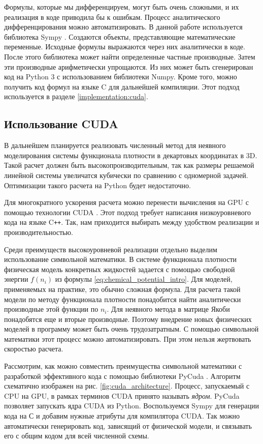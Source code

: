 Формулы, которые мы дифференцируем, могут быть очень сложными, и их реализация в коде приводила бы к ошибкам. Процесс аналитического дифференцирования можно автоматизировать. В данной работе используется библиотека Sympy \cite{Sympy}. Создаются объекты, представляющие математические переменные. Исходные формулы выражаются через них аналитически в коде. После этого библиотека может найти определенные частные производные. Затем эти производные арифметически упрощаются. Из них может быть сгенерирован код на Python 3 с использованием библиотеки Numpy. Кроме того, можно получить код формул на языке C для дальнейшей компиляции. Этот подход используется в разделе \ref{implementation:cuda}.
\subsection{Использование CUDA \label{implementation:cuda}}
В дальнейшем планируется реализовать численный метод для неявного моделирования системы функционала плотности в декартовых координатах в 3D. Такой расчет должен быть высокопроизводительным, так как размеры решаемой линейной системы увеличатся кубически по сравнению с одномерной задачей. Оптимизации такого расчета на Python будет недостаточно. 
\par
Для многократного ускорения расчета можно перенести вычисления на GPU с помощью технологии CUDA \cite{Cuda}. Этот подход требует написания низкоуровневого кода на языке C\texttt{++}. Так, нам приходится выбирать между удобством реализации и производительностью. 
\par
Среди преимуществ высокоуровневой реализации отдельно выделим использование символьной математики. В системе функционала плотности физическая модель конкретных жидкостей задается с помощью свободной энергии $f(n_i)$ из формулы \eqref{eq:chemical_potential_intro}. Для моделей, применяемых на практике, это обычно сложная формула. Для расчета такой модели по методу функционала плотности понадобится найти аналитически производные этой функции по $n_i$. Для неявного метода в матрице Якоби понадобятся еще и вторые производные. Поэтому внедрение новых физических моделей в программу может быть очень трудозатратным. С помощью символьной математики этот процесс можно автоматизировать. При этом нельзя жертвовать скоростью расчета.
\par
Рассмотрим, как можно совместить преимущества символьной математики с разработкой эффективного кода с помощью библиотеки PyCuda \cite{Pycuda}. Алгоритм схематично изображен на рис. \ref{fig:cuda_architecture}.
Процесс, запускаемый с CPU на GPU, в рамках терминов CUDA принято называть \textit{ядром}. PyCuda позволяет запускать ядра CUDA из Python. Воспользуемся Sympy для генерации кода на С и добавим нужные атрибуты для компилятора CUDA. Так можно автоматически генерировать код, зависящий от физической модели, и связывать его с общим кодом для всей численной схемы.

